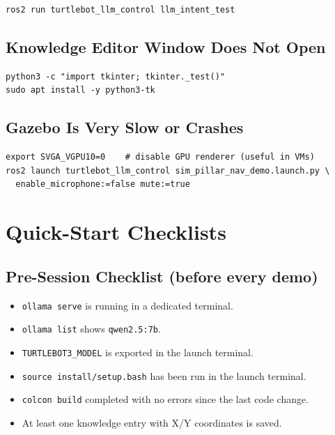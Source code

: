 \documentclass[12pt,a4paper]{report}
\begin{document}
\begin{lstlisting}[style=bashstyle]
ros2 run turtlebot_llm_control llm_intent_test
\end{lstlisting}

\subsection{Knowledge Editor Window Does Not Open}

\begin{lstlisting}[style=bashstyle]
python3 -c "import tkinter; tkinter._test()"
sudo apt install -y python3-tk
\end{lstlisting}

\subsection{Gazebo Is Very Slow or Crashes}

\begin{lstlisting}[style=bashstyle]
export SVGA_VGPU10=0    # disable GPU renderer (useful in VMs)
ros2 launch turtlebot_llm_control sim_pillar_nav_demo.launch.py \
  enable_microphone:=false mute:=true
\end{lstlisting}

\section{Quick-Start Checklists}

\subsection*{Pre-Session Checklist (before every demo)}

\begin{itemize}[leftmargin=2em, label=$\square$]
  \item \texttt{ollama serve} is running in a dedicated terminal.
  \item \texttt{ollama list} shows \texttt{qwen2.5:7b}.
  \item \texttt{TURTLEBOT3\_MODEL} is exported in the launch terminal.
  \item \texttt{source install/setup.bash} has been run in the launch terminal.
  \item \texttt{colcon build} completed with no errors since the last code change.
  \item At least one knowledge entry with X/Y coordinates is saved.
\end{itemize}
\end{document}
